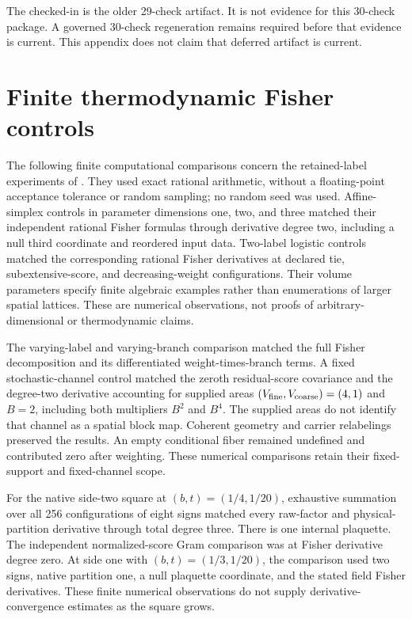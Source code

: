 The checked-in  is the older
29-check artifact.  It is not evidence for this 30-check package.  A governed
30-check regeneration remains required before that evidence is current.  This
appendix does not claim that deferred artifact is current.

\section{Finite thermodynamic Fisher controls}
\label{sec:rg-thermo-numerical-provenance}

The following finite computational comparisons concern the retained-label
experiments of . They used exact
rational arithmetic, without a floating-point acceptance tolerance or
random sampling; no random seed was used. Affine-simplex controls in
parameter dimensions one, two, and three matched their independent
rational Fisher formulas through derivative degree two, including a null
third coordinate and reordered input data. Two-label logistic controls
matched the corresponding rational Fisher derivatives at declared tie,
subextensive-score, and decreasing-weight configurations. Their volume
parameters specify finite algebraic examples rather than enumerations of
larger spatial lattices. These are numerical observations, not proofs of
arbitrary-dimensional or thermodynamic claims. 

The varying-label and varying-branch comparison matched the full Fisher
decomposition and its differentiated weight-times-branch terms. A fixed
stochastic-channel control matched the zeroth residual-score covariance
and the degree-two derivative accounting for supplied areas
$(V_{\rm fine},V_{\rm coarse})=(4,1)$ and $B=2$, including both
multipliers $B^2$ and $B^4$. The supplied areas do not identify that
channel as a spatial block map. Coherent geometry and carrier
relabelings preserved the results. An empty conditional fiber remained
undefined and contributed zero after weighting. These numerical
comparisons retain their fixed-support and fixed-channel scope.

For the native side-two square at $(b,t)=(1/4,1/20)$, exhaustive summation
over all 256 configurations of eight signs matched every raw-factor and
physical-partition derivative through total degree three. There is one
internal plaquette. The independent normalized-score Gram comparison was
at Fisher derivative degree zero. At side one with
$(b,t)=(1/3,1/20)$, the comparison used two signs, native partition one,
a null plaquette coordinate, and the stated field Fisher derivatives.
These finite numerical observations do not supply derivative-convergence
estimates as the square grows. 

